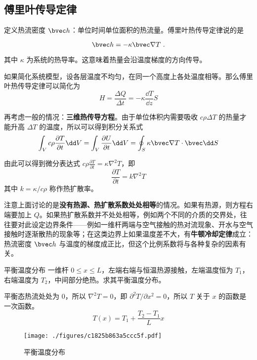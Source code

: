 

\subsection{傅里叶传导定律}
定义热流密度 $\bvec h$：单位时间单位面积的热流量。傅里叶热传导定律说的是

\begin{equation}
\bvec h = -\kappa \bvec \nabla T~.
\end{equation}

其中 $\kappa$ 为系统的热导率。这意味着热量会沿温度梯度的方向传导。

如果简化系统模型，设各层温度不均匀，在同一个高度上各处温度相等。那么傅里叶热传导定律可以简化为
\begin{equation}
H=\frac{\Delta Q}{\Delta t}=-\kappa \frac{\dd T}{\dd z}S
\end{equation}

再考虑一般的情况：\textbf{三维热传导方程}。由于单位体积内需要吸收 $c\rho \Delta T$ 的热量才能升高 $\Delta T$ 的温度，所以可以得到积分关系式
\begin{equation}
\int_V c\rho \frac{\partial T}{\partial t} \dd V = \int_V \frac{\partial U}{\partial t} \dd V= \oint_S \kappa \bvec \nabla T \cdot \bvec \dd S
\end{equation}

由此可以得到微分表达式 $c\rho \frac{\partial T}{\partial t} = \kappa \nabla^2 T$，即
\begin{equation}
\frac{\partial T}{\partial t}=k\nabla^2 T
\end{equation}
其中 $k=\kappa/c\rho$ 称作热扩散率。

注意上面讨论的是\textbf{没有热源、热扩散系数处处相等}的情况。如果有热源，则方程右端要加上 $Q$。如果热扩散系数并不处处相等，例如两个不同的介质的交界处，往往要对此设定边界条件——例如一维杆两端与空气接触的热对流现象、开水与空气接触时逐渐散热的现象等；在这类边界上如果温度差不大，有\textbf{牛顿冷却定律}成立：热流密度 $\bvec h$ 与温度的梯度成正比，但这个比例系数将与各种复杂的因素有关。

\begin{example}{平衡温度分布}
一维杆 $0\le x\le L$，左端右端与恒温热源接触，左端温度恒为 $T_1$，右端温度为 $T_2$，中间部分绝热。求其平衡温度分布。

平衡态热流处处为 $0$，所以 $\nabla^2 T=0$，即 $\partial^2 T/\partial x^2=0$，所以 $T$ 关于 $x$ 的函数是一次函数。
\begin{equation}
T(x)=T_1+\frac{T_2-T_1}{L}x
\end{equation}

\begin{figure}[ht]
\centering
\texttt{[image: ./figures/c1825b863a5ccc5f.pdf]}
\caption{平衡温度分布} \label{fig_heatc_2}
\end{figure}
\end{example}

